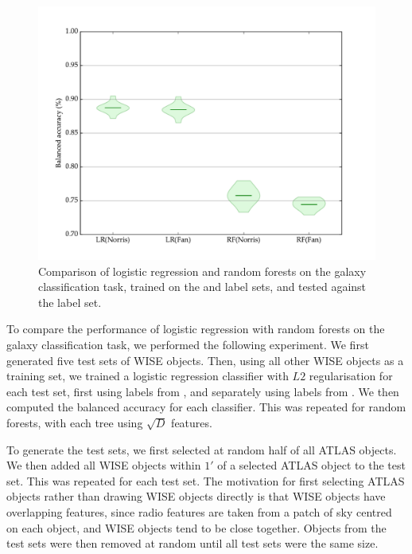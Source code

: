   \begin{figure}[!ht]
    \centering
    \includegraphics[width=\textwidth]{images/experiments/lr_rf}
    \caption{Comparison of logistic regression and random forests on the galaxy
      classification task, trained on the \citet{norris06} and \citet{fan15}
      label sets, and tested against the \citet{norris06} label set.}
  \end{figure}

  To compare the performance of logistic regression with random forests on the
  galaxy classification task, we performed the following experiment. We first
  generated five test sets of WISE objects. Then, using all other WISE objects
  as a training set, we trained a logistic regression classifier with $L2$
  regularisation for each test set, first using labels from \citet{norris06},
  and separately using labels from \citet{fan15}. We then computed the balanced
  accuracy for each classifier. This was repeated for random forests, with each
  tree using $\sqrt{D}$ features.

  To generate the test sets, we first selected at random half of all ATLAS
  objects. We then added all WISE objects within $1'$ of a selected ATLAS object
  to the test set. This was repeated for each test set. The motivation for first
  selecting ATLAS objects rather than drawing WISE objects directly is that WISE
  objects have overlapping features, since radio features are taken from a patch
  of sky centred on each object, and WISE objects tend to be close together.
  Objects from the test sets were then removed at random until all test sets
  were the same size.

